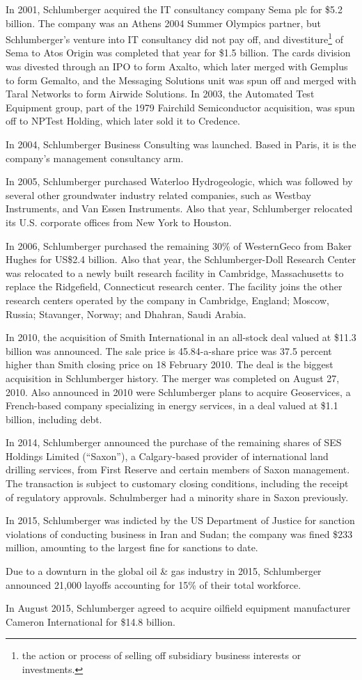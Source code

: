 \documentclass[12pt,a4paper]{report}
\begin{document}
In 2001, Schlumberger acquired the IT consultancy company Sema plc for \$5.2
billion. The company was an Athens 2004 Summer Olympics partner, but
Schlumberger's venture into IT consultancy did not pay off, and
divestiture\footnote{the action or process of selling off subsidiary
  business interests or investments.} of Sema to Atos Origin was completed
that year for \$1.5 billion. The cards division was divested through an IPO
to form Axalto, which later merged with Gemplus to form Gemalto, and the
Messaging Solutions unit was spun off and merged with Taral Networks to form
Airwide Solutions. In 2003, the Automated Test Equipment group, part of the
1979 Fairchild Semiconductor acquisition, was spun off to NPTest Holding,
which later sold it to Credence.

In 2004, Schlumberger Business Consulting was launched. Based in Paris, it
is the company's management consultancy arm.

In 2005, Schlumberger purchased Waterloo Hydrogeologic, which was followed
by several other groundwater industry related companies, such as Westbay
Instruments, and Van Essen Instruments. Also that year, Schlumberger
relocated its U.S. corporate offices from New York to Houston.

In 2006, Schlumberger purchased the remaining 30\% of WesternGeco from Baker
Hughes for US\$2.4 billion. Also that year, the Schlumberger-Doll
Research Center was relocated to a newly built research facility in
Cambridge, Massachusetts to replace the Ridgefield, Connecticut research
center. The facility joins the other research centers operated by the
company in Cambridge, England; Moscow, Russia; Stavanger, Norway; and
Dhahran, Saudi Arabia.

In 2010, the acquisition of Smith International in an all-stock deal valued
at \$11.3 billion was announced. The sale price is 45.84-a-share price was
37.5 percent higher than Smith closing price on 18 February 2010. The deal
is the biggest acquisition in Schlumberger history. The merger was
completed on August 27, 2010. Also announced in 2010 were Schlumberger
plans to acquire Geoservices, a French-based company specializing in energy
services, in a deal valued at \$1.1 billion, including debt.

In 2014, Schlumberger announced the purchase of the remaining shares of SES
Holdings Limited (``Saxon''), a Calgary-based provider of international land
drilling services, from First Reserve and certain members of Saxon
management. The transaction is subject to customary closing conditions,
including the receipt of regulatory approvals. Schulmberger had a minority
share in Saxon previously.

In 2015, Schlumberger was indicted by the US Department of Justice for
sanction violations of conducting business in Iran and Sudan; the company
was fined \$233 million, amounting to the largest fine for sanctions to
date.

Due to a downturn in the global oil \& gas industry in 2015, Schlumberger
announced 21,000 layoffs accounting for 15\% of their total workforce.

In August 2015, Schlumberger agreed to acquire oilfield equipment
manufacturer Cameron International for \$14.8 billion.

 
 
\end{document}
